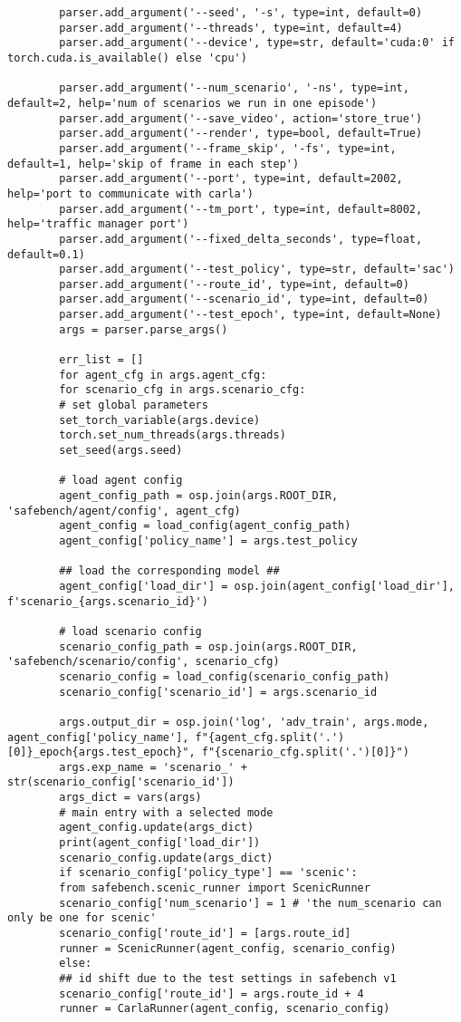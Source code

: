 \begin{lstlisting}
		parser.add_argument('--seed', '-s', type=int, default=0)
		parser.add_argument('--threads', type=int, default=4)
		parser.add_argument('--device', type=str, default='cuda:0' if torch.cuda.is_available() else 'cpu')   
		
		parser.add_argument('--num_scenario', '-ns', type=int, default=2, help='num of scenarios we run in one episode')
		parser.add_argument('--save_video', action='store_true')
		parser.add_argument('--render', type=bool, default=True)
		parser.add_argument('--frame_skip', '-fs', type=int, default=1, help='skip of frame in each step')
		parser.add_argument('--port', type=int, default=2002, help='port to communicate with carla')
		parser.add_argument('--tm_port', type=int, default=8002, help='traffic manager port')
		parser.add_argument('--fixed_delta_seconds', type=float, default=0.1)
		parser.add_argument('--test_policy', type=str, default='sac')
		parser.add_argument('--route_id', type=int, default=0)
		parser.add_argument('--scenario_id', type=int, default=0)
		parser.add_argument('--test_epoch', type=int, default=None)
		args = parser.parse_args()
		
		err_list = []
		for agent_cfg in args.agent_cfg:
		for scenario_cfg in args.scenario_cfg:
		# set global parameters
		set_torch_variable(args.device)
		torch.set_num_threads(args.threads)
		set_seed(args.seed)
		
		# load agent config
		agent_config_path = osp.join(args.ROOT_DIR, 'safebench/agent/config', agent_cfg)
		agent_config = load_config(agent_config_path)
		agent_config['policy_name'] = args.test_policy
		
		## load the corresponding model ##
		agent_config['load_dir'] = osp.join(agent_config['load_dir'], f'scenario_{args.scenario_id}')
		
		# load scenario config
		scenario_config_path = osp.join(args.ROOT_DIR, 'safebench/scenario/config', scenario_cfg)
		scenario_config = load_config(scenario_config_path)
		scenario_config['scenario_id'] = args.scenario_id
		
		args.output_dir = osp.join('log', 'adv_train', args.mode, agent_config['policy_name'], f"{agent_cfg.split('.')[0]}_epoch{args.test_epoch}", f"{scenario_cfg.split('.')[0]}")
		args.exp_name = 'scenario_' + str(scenario_config['scenario_id'])
		args_dict = vars(args)
		# main entry with a selected mode
		agent_config.update(args_dict)
		print(agent_config['load_dir'])
		scenario_config.update(args_dict)
		if scenario_config['policy_type'] == 'scenic':
		from safebench.scenic_runner import ScenicRunner
		scenario_config['num_scenario'] = 1 # 'the num_scenario can only be one for scenic'
		scenario_config['route_id'] = [args.route_id]
		runner = ScenicRunner(agent_config, scenario_config)
		else:
		## id shift due to the test settings in safebench v1
		scenario_config['route_id'] = args.route_id + 4
		runner = CarlaRunner(agent_config, scenario_config)
		

\end{lstlisting}
